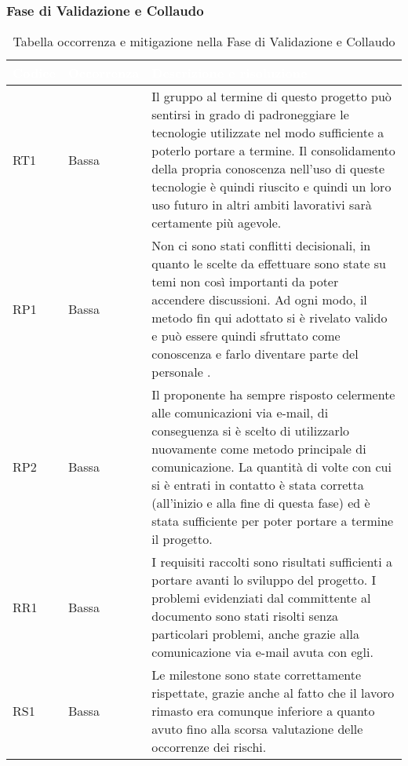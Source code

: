 \subsubsection{Fase di Validazione e Collaudo}
{
\renewcommand{\arraystretch}{2}
\centering
\begin{longtable}{C{2cm} C{3cm} C{10cm}}
\caption{Tabella occorrenza e mitigazione nella Fase di Validazione e Collaudo}\\

\textcolor{white}{\textbf{Codice}} & 
\textcolor{white}{\textbf{Occorrenza}} & 
\textcolor{white}{\textbf{Descrizione e risoluzione}}\\	
\endhead

RT1 &
Bassa &
Il gruppo al termine di questo progetto può sentirsi in grado di padroneggiare le tecnologie utilizzate nel modo sufficiente a poterlo portare a termine. Il consolidamento della propria conoscenza nell'uso di queste tecnologie è quindi riuscito e quindi un loro uso futuro in altri ambiti lavorativi sarà certamente più agevole. \\

RP1 &
Bassa &
Non ci sono stati conflitti decisionali, in quanto le scelte da effettuare sono state su temi non così importanti da poter accendere discussioni. Ad ogni modo, il metodo fin qui adottato si è rivelato valido e può essere quindi sfruttato come conoscenza e farlo diventare parte del personale . \\

RP2 &
Bassa &
Il proponente ha sempre risposto celermente alle comunicazioni via e-mail, di conseguenza si è scelto di utilizzarlo nuovamente come metodo principale di comunicazione. La quantità di volte con cui si è entrati in contatto è stata corretta (all'inizio e alla fine di questa fase) ed è stata sufficiente per poter portare a termine il progetto. \\

RR1 &
Bassa &
I requisiti raccolti sono risultati sufficienti a portare avanti lo sviluppo del progetto. I problemi evidenziati dal committente al documento \AdR{} sono stati risolti senza particolari problemi, anche grazie alla comunicazione via e-mail avuta con egli. \\

RS1 &
Bassa &
Le milestone sono state correttamente rispettate, grazie anche al fatto che il lavoro rimasto era comunque inferiore a quanto avuto fino alla scorsa valutazione delle occorrenze dei rischi. \\


\end{longtable}}
